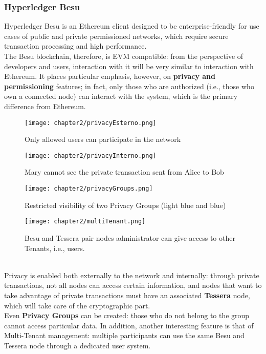 \subsubsection{Hyperledger Besu}
Hyperledger Besu\cite{site:besu} is an Ethereum client designed to be enterprise-friendly for use cases 
of public and private permissioned networks, which require secure transaction processing
and high performance.\\
The Besu blockchain, therefore, is EVM compatible: from the perspective of developers 
and users, interaction with it will be very similar to interaction with Ethereum. It 
places particular emphasis, however, on \textbf{privacy and permissioning} features; in fact, 
only those who are authorized (i.e., those who own a connected node) can interact with 
the system, which is the primary difference from Ethereum.
\begin{figure}[!htb]
    \begin{minipage}{0.48\textwidth}
        \centering
        \texttt{[image: chapter2/privacyEsterno.png]}
        \caption{Only allowed users can participate in the network}
    \end{minipage}\hfill
    \begin{minipage}{0.48\textwidth}
        \centering
        \texttt{[image: chapter2/privacyInterno.png]}
        \caption{Mary cannot see the private transaction sent from Alice to Bob}
    \end{minipage}
\end{figure}
\begin{figure}[!htb]
    \begin{minipage}{0.48\textwidth}
        \centering
        \texttt{[image: chapter2/privacyGroups.png]}
        \caption{Restricted visibility of two Privacy Groups (light blue and blue)}
    \end{minipage}\hfill
    \begin{minipage}{0.48\textwidth}
        \centering
        \texttt{[image: chapter2/multiTenant.png]}
        \caption{Besu and Tessera pair nodes administrator can give access to other Tenants, i.e., users.}
    \end{minipage}
\end{figure}\\
Privacy is enabled both externally to the network and internally: through private 
transactions, not all nodes can access certain information, and nodes that want to 
take advantage of private transactions must have an associated \textbf{Tessera} node, which 
will take care of the cryptographic part.\\
Even \textbf{Privacy Groups} can be created: those who do not belong to the group cannot access 
particular data. In addition, another interesting feature is that of Multi-Tenant 
management: multiple participants can use the same Besu and Tessera node through a 
dedicated user system\cite{site:besudocs}.

